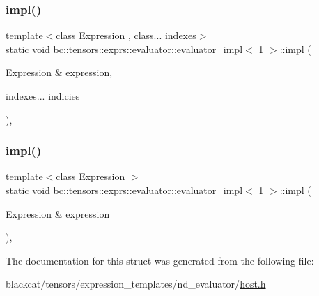 \subsubsection{\texorpdfstring{impl()}{impl()}\hspace{0.1cm}{\footnotesize\ttfamily [1/2]}}
{\footnotesize\ttfamily template$<$class Expression , class... indexes$>$ \\
static void \hyperlink{structbc_1_1tensors_1_1exprs_1_1evaluator_1_1evaluator__impl}{bc\+::tensors\+::exprs\+::evaluator\+::evaluator\+\_\+impl}$<$ 1 $>$\+::impl (\begin{DoxyParamCaption}\item[{Expression \&}]{expression,  }\item[{indexes...}]{indicies }\end{DoxyParamCaption})\hspace{0.3cm}{\ttfamily [inline]}, {\ttfamily [static]}}

\mbox{\label{structbc_1_1tensors_1_1exprs_1_1evaluator_1_1evaluator__impl_3_011_01_4_ae5cc9c326c201aefa9d1dafa077b5dc9}} 
\subsubsection{\texorpdfstring{impl()}{impl()}\hspace{0.1cm}{\footnotesize\ttfamily [2/2]}}
{\footnotesize\ttfamily template$<$class Expression $>$ \\
static void \hyperlink{structbc_1_1tensors_1_1exprs_1_1evaluator_1_1evaluator__impl}{bc\+::tensors\+::exprs\+::evaluator\+::evaluator\+\_\+impl}$<$ 1 $>$\+::impl (\begin{DoxyParamCaption}\item[{Expression \&}]{expression }\end{DoxyParamCaption})\hspace{0.3cm}{\ttfamily [inline]}, {\ttfamily [static]}}



The documentation for this struct was generated from the following file\+:\begin{DoxyCompactItemize}
\item 
blackcat/tensors/expression\+\_\+templates/nd\+\_\+evaluator/\hyperlink{tensors_2expression__templates_2nd__evaluator_2host_8h}{host.\+h}\end{DoxyCompactItemize}
